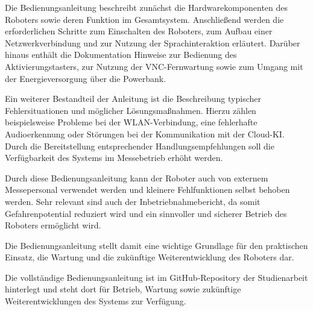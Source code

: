 Die Bedienungsanleitung beschreibt zunächst die Hardwarekomponenten des Roboters sowie deren Funktion im Gesamtsystem. Anschließend werden die erforderlichen Schritte zum Einschalten des Roboters, zum Aufbau einer Netzwerkverbindung und zur Nutzung der Sprachinteraktion erläutert. Darüber hinaus enthält die Dokumentation Hinweise zur Bedienung des Aktivierungstasters, zur Nutzung der VNC-Fernwartung sowie zum Umgang mit der Energieversorgung über die Powerbank.

Ein weiterer Bestandteil der Anleitung ist die Beschreibung typischer Fehlersituationen und möglicher Lösungsmaßnahmen. Hierzu zählen beispielsweise Probleme bei der WLAN-Verbindung, eine fehlerhafte Audioerkennung oder Störungen bei der Kommunikation mit der Cloud-KI. Durch die Bereitstellung entsprechender Handlungsempfehlungen soll die Verfügbarkeit des Systems im Messebetrieb erhöht werden.

Durch diese Bedienungsanleitung kann der Roboter auch von externem Messepersonal verwendet werden und kleinere Fehlfunktionen selbst behoben werden.
Sehr relevant sind auch der Inbetriebnahmebericht, da somit Gefahrenpotential reduziert wird und ein sinnvoller und sicherer Betrieb des Roboters ermöglicht wird.

Die Bedienungsanleitung stellt damit eine wichtige Grundlage für den praktischen Einsatz, die Wartung und die zukünftige Weiterentwicklung des Roboters dar.

Die vollständige Bedienungsanleitung ist im GitHub-Repository der Studienarbeit hinterlegt und steht dort für Betrieb, Wartung sowie zukünftige Weiterentwicklungen des Systems zur Verfügung.


